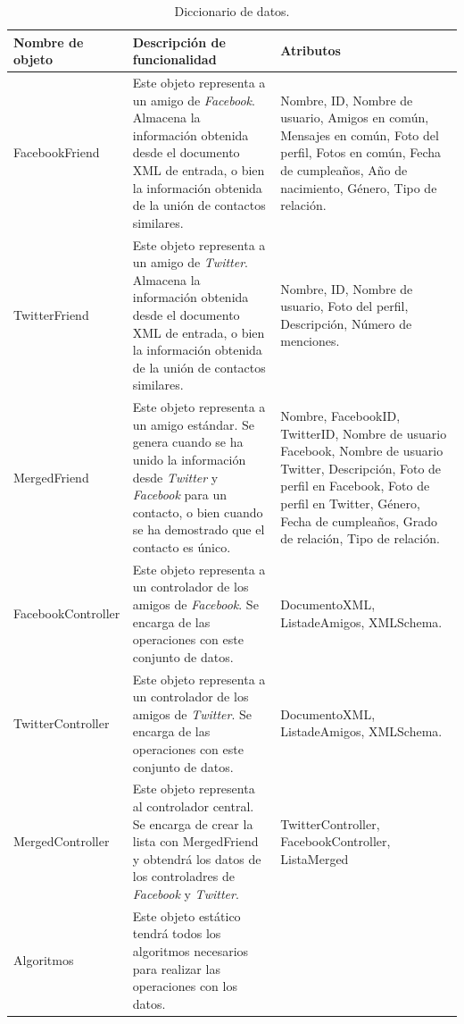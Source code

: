 \begin{table}[H]
\begin{center}
\caption[Diccionario de datos.]{Diccionario de datos.}
\label{tab:des-tab05}
\begin{tabular}{|l|>{\raggedright}p{8cm}|>{\raggedright}p{5cm}|}
\hline 
Nombre de objeto & Descripción de funcionalidad & Atributos\tabularnewline
\hline 
\hline 
FacebookFriend & Este objeto representa a un amigo de \emph{Facebook}. Almacena la
información obtenida desde el documento XML de entrada, o bien la
información obtenida de la unión de contactos similares. & Nombre, ID, Nombre de usuario, Amigos en común, Mensajes en común,
Foto del perfil, Fotos en común, Fecha de cumpleaños, Año de nacimiento,
Género, Tipo de relación. \tabularnewline
\hline 
TwitterFriend & Este objeto representa a un amigo de \emph{Twitter}. Almacena la información
obtenida desde el documento XML de entrada, o bien la información
obtenida de la unión de contactos similares. & Nombre, ID, Nombre de usuario, Foto del perfil, Descripción, Número
de menciones. \tabularnewline
\hline 
MergedFriend & Este objeto representa a un amigo estándar. Se genera cuando se ha
unido la información desde \emph{Twitter} y \emph{Facebook} para un
contacto, o bien cuando se ha demostrado que el contacto es único. & Nombre, FacebookID, TwitterID, Nombre de usuario Facebook, Nombre
de usuario Twitter, Descripción, Foto de perfil en Facebook, Foto
de perfil en Twitter, Género, Fecha de cumpleaños, Grado de relación,
Tipo de relación. \tabularnewline
\hline 
FacebookController & Este objeto representa a un controlador de los amigos de \emph{Facebook}.
Se encarga de las operaciones con este conjunto de datos. & DocumentoXML, ListadeAmigos, XMLSchema.\tabularnewline
\hline 
TwitterController & Este objeto representa a un controlador de los amigos de \emph{Twitter}.
Se encarga de las operaciones con este conjunto de datos. & DocumentoXML, ListadeAmigos, XMLSchema.\tabularnewline
\hline 
MergedController & Este objeto representa al controlador central. Se encarga de crear
la lista con MergedFriend y obtendrá los datos de los controladres
de \emph{Facebook} y \emph{Twitter}. & TwitterController, FacebookController, ListaMerged\tabularnewline
\hline 
Algoritmos & Este objeto estático tendrá todos los algoritmos necesarios para realizar
las operaciones con los datos. & \tabularnewline
\hline 
\end{tabular}
\end{center}
\end{table}

